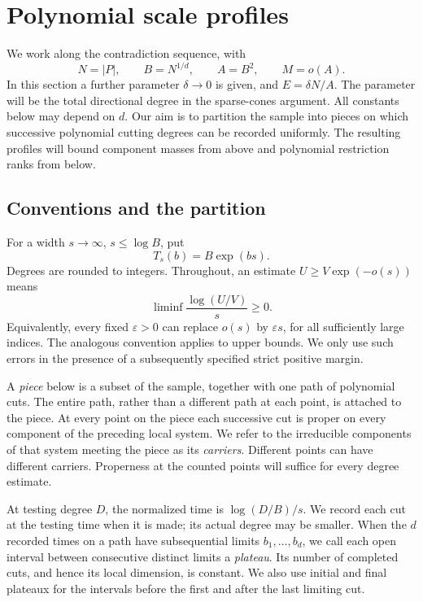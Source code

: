 \section{Polynomial scale profiles}\label{sec:profiles}

We work along the contradiction sequence, with
\[
 N=|P|,\qquad B=N^{1/d},\qquad A=B^2,\qquad M=o(A).
\]
In this section a further parameter $\delta\to0$ is given, and
$E=\delta N/A$.  The parameter will be the total directional degree in
the sparse-cones argument.  All constants below may depend on $d$.
Our aim is to partition the sample into pieces on which successive
polynomial cutting degrees can be recorded uniformly.  The resulting
profiles will bound component masses from above and polynomial
restriction ranks from below.

\subsection{Conventions and the partition}

For a width $s\to\infty$, $s\le\log B$, put
\begin{equation}\label{prof:testing-degree}
 T_s(b)=B\exp(bs).
\end{equation}
Degrees are rounded to integers.  Throughout, an estimate
$U\ge V\exp(-o(s))$ means
\[
 \liminf\frac{\log(U/V)}s\ge0.
\]
Equivalently, every fixed $\varepsilon>0$ can replace $o(s)$ by
$\varepsilon s$, for all sufficiently large indices.  The analogous
convention applies to upper bounds.  We only use such errors in the
presence of a subsequently specified strict positive margin.

A \emph{piece} below is a subset of the sample, together with one path
of polynomial cuts.  The entire path, rather than a different path at
each point, is attached to the piece.  At every point on the piece each
successive cut is proper on every component of the preceding local
system.  We refer to the irreducible components of that system meeting
the piece as its \emph{carriers}.  Different points can have different
carriers.  Properness at the counted points will suffice for every
degree estimate.

At testing degree $D$, the normalized time is $\log(D/B)/s$.
We record each cut at the testing time when it is made; its actual
degree may be smaller.  When the $d$ recorded times on a path have
subsequential limits $b_1,\ldots,b_d$,
we call each open interval between consecutive distinct limits a
\emph{plateau}.  Its number of completed cuts, and hence its local
dimension, is constant.  We also use initial and final plateaux for
the intervals before the first and after the last limiting cut.

